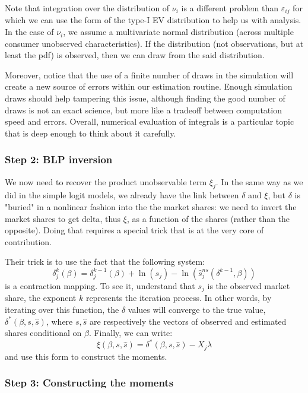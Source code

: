 Note that integration over the distribution of $\nu_i$ is a different problem than $\varepsilon_{ij}$ for which we can use the form of the type-I EV distribution to help us with analysis. In the case of $\nu_i$, we assume a multivariate normal distribution (across multiple consumer unobserved characteristics). If the distribution (not observations, but at least the pdf) is observed, then we can draw from the said distribution.

Moreover, notice that the use of a finite number of draws in the simulation will create a new source of errors within our estimation routine. Enough simulation draws should help tampering this issue, although finding the good number of draws is not an exact science, but more like a tradeoff between computation speed and errors. Overall, numerical evaluation of integrals is a particular topic that is deep enough to think about it carefully.

\subsubsection{Step 2: BLP inversion}

We now need to recover the product unobservable term $\xi_j$. In the same way as we did in the simple logit models, we already have the link between $\delta$ and $\xi$, but $\delta$ is "buried" in a nonlinear fashion into the the market shares: we need to invert the market shares to get delta, thus $\xi$, as a function of the shares (rather than the opposite). Doing that requires a special trick that is at the very core of\cite{blp_95} contribution.

Their trick is to use the fact that the following system: $$\delta_j^k(\beta) = \delta_j^{k-1}(\beta) + \ln(s_j) - \ln(\hat s_j^{ns}(\delta^{k-1}, \beta)) $$ is a contraction mapping. To see it, understand that $s_j$ is the observed market share, the exponent $k$ represents the iteration process. In other words, by iterating over this function, the $\delta$ values will converge to the true value, $\delta^*(\beta, s, \hat s)$, where $s, \hat s$ are respectively the vectors of observed and estimated shares conditional on $\beta$. Finally, we can write: $$\xi(\beta, s, \hat s) = \delta^*(\beta, s, \hat s) - X_j\lambda $$ and use this form to construct the moments.

\subsubsection{Step 3: Constructing the moments}

